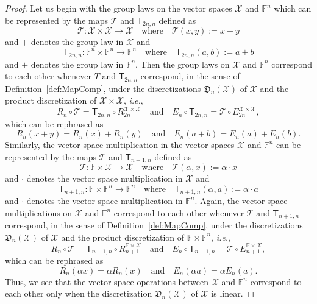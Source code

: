 \documentclass[a4paper]{paper}
\newcommand{\discr}{\mathfrak{D}}
\newcommand{\VecSpace}[1]{\mathscr{#1}}
\newcommand{\Field}{\mathbb{F}}
\newcommand{\Op}[1]{\mathcal{#1}}
\newcommand{\DiscOp}[1]{\mathsf{#1}}
\newcommand{\ie}{\textsl{i.e.}\xspace}
\begin{document}
\begin{proof}
Let us begin with the  group laws on the vector spaces $\VecSpace{X}$ and $\Field^{n}$ which can be 
represented by the maps $\Op{T}$ and $\DiscOp{T}_{2n,n}$ defined as  
\[ \Op{T} \colon \VecSpace{X} \times \VecSpace{X} \to \VecSpace{X} 
    \quad\text{where}\quad \Op{T}(x,y):=x+y \] 
and $+$ denotes the group law in $\VecSpace{X}$ and 
\[ \DiscOp{T}_{2n,n} \colon \Field^{n} \times \Field^{n} \to \Field^{n} 
   \quad\text{where}\quad \DiscOp{T}_{2n,n}(a,b):=a+b \] 
and $+$ denotes the group law in $\Field^{n}$. Then the group laws on $\VecSpace{X}$ and $\Field^{n}$ 
correspond to each other whenever $T$ and $\DiscOp{T}_{2n,n}$ correspond,
in the sense of Definition~\ref{def:MapComp},  under the discretizations $\discr_{n}(\VecSpace{X})$ of $\VecSpace{X}$ 
and the product discretization of $\VecSpace{X}\times \VecSpace{X}$, \ie,
\[ R_{n} \circ \Op{T} =  \DiscOp{T}_{2n,n} \circ R_{2n}^{\VecSpace{X}\times \VecSpace{X}} 
   \quad\text{and}\quad 
   E_{n}\circ \DiscOp{T}_{2n,n} = \Op{T} \circ E_{2n}^{\VecSpace{X}\times \VecSpace{X}},
\]
which can be rephrased as
\[ R_{n}(x+y) =  R_{n}(x)+R_{n}(y) 
   \quad\text{and}\quad 
   E_{n}(a+b) = E_{n}(a)+E_{n}(b).
\]
Similarly, the vector space multiplication in the vector spaces $\VecSpace{X}$ and $\Field^{n}$ 
can be represented by the maps $\Op{T}$ and $\DiscOp{T}_{n+1,n}$ defined as
\[ \Op{T} \colon \Field \times \VecSpace{X} \to \VecSpace{X} 
   \quad\text{where}\quad \Op{T}(\alpha,x):=\alpha \cdot x \] 
and $\cdot$ denotes the vector space multiplication in $\VecSpace{X}$ and 
\[ \DiscOp{T}_{n+1,n} \colon  \Field \times \Field^{n} \to \Field^{n} 
   \quad\text{where}\quad \DiscOp{T}_{n+1,n}(\alpha,a):=\alpha\cdot a  \] 
and $\cdot$ denotes the vector space multiplication in $\Field^{n}$. Again, 
the vector space multiplications on $\VecSpace{X}$ and $\Field^{n}$ 
correspond to each other whenever $\Op{T}$ and $\DiscOp{T}_{n+1,n}$ correspond,
in the sense of Definition~\ref{def:MapComp}, under the discretizations $\discr_{n}(\VecSpace{X})$ of $\VecSpace{X}$ 
and the product discretization of  $\Field \times \Field^{n}$, \ie,
\[ R_{n} \circ \Op{T} =  \DiscOp{T}_{n+1,n} \circ R_{n+1}^{\Field \times \VecSpace{X}}
   \quad\text{and}\quad 
   E_{n}\circ \DiscOp{T}_{n+1,n} =  \Op{T} \circ E_{n+1}^{\Field \times \VecSpace{X}},
\]
which can be rephrased as
\[ R_{n}(\alpha x) =  \alpha R_{n}(x) 
   \quad\text{and}\quad 
   E_{n}(\alpha a) = \alpha E_{n}(a).
\]
Thus, we see that the vector space operations between $\VecSpace{X}$ and $\Field^{n}$ correspond
to each other only when the discretization $\discr_{n}(\VecSpace{X})$ of $\VecSpace{X}$ is linear.
\end{proof}
\end{document}
